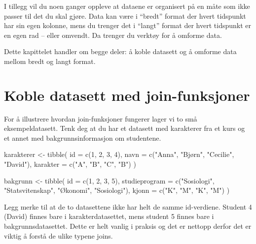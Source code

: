 \documentclass[
  norsk,
  letterpaper,
  DIV=11,
  numbers=noendperiod]{scrreprt}
\newenvironment{Shaded}{\begin{snugshade}}{\end{snugshade}}
\newcommand{\AttributeTok}[1]{\textcolor[rgb]{0.40,0.45,0.13}{#1}}
\newcommand{\DecValTok}[1]{\textcolor[rgb]{0.68,0.00,0.00}{#1}}
\newcommand{\FunctionTok}[1]{\textcolor[rgb]{0.28,0.35,0.67}{#1}}
\newcommand{\NormalTok}[1]{\textcolor[rgb]{0.00,0.23,0.31}{#1}}
\newcommand{\OtherTok}[1]{\textcolor[rgb]{0.00,0.23,0.31}{#1}}
\newcommand{\StringTok}[1]{\textcolor[rgb]{0.13,0.47,0.30}{#1}}
\theoremstyle{definition}
\theoremstyle{remark}
\begin{document}
I tillegg vil du noen ganger oppleve at dataene er organisert på en måte
som ikke passer til det du skal gjøre. Data kan være i ``bredt'' format
der hvert tidspunkt har sin egen kolonne, mens du trenger det i
``langt'' format der hvert tidspunkt er en egen rad -- eller omvendt. Da
trenger du verktøy for å omforme data.

Dette kapittelet handler om begge deler: å koble datasett og å omforme
data mellom bredt og langt format.

\section{Koble datasett med
join-funksjoner}\label{koble-datasett-med-join-funksjoner}

For å illustrere hvordan join-funksjoner fungerer lager vi to små
eksempeldatasett. Tenk deg at du har et datasett med karakterer fra et
kurs og et annet med bakgrunnsinformasjon om studentene.

\begin{Shaded}
\begin{Highlighting}[]
\NormalTok{karakterer }\OtherTok{\textless{}{-}} \FunctionTok{tibble}\NormalTok{(}
  \AttributeTok{id =} \FunctionTok{c}\NormalTok{(}\DecValTok{1}\NormalTok{, }\DecValTok{2}\NormalTok{, }\DecValTok{3}\NormalTok{, }\DecValTok{4}\NormalTok{),}
  \AttributeTok{navn =} \FunctionTok{c}\NormalTok{(}\StringTok{"Anna"}\NormalTok{, }\StringTok{"Bjørn"}\NormalTok{, }\StringTok{"Cecilie"}\NormalTok{, }\StringTok{"David"}\NormalTok{),}
  \AttributeTok{karakter =} \FunctionTok{c}\NormalTok{(}\StringTok{"A"}\NormalTok{, }\StringTok{"B"}\NormalTok{, }\StringTok{"C"}\NormalTok{, }\StringTok{"B"}\NormalTok{)}
\NormalTok{)}

\NormalTok{bakgrunn }\OtherTok{\textless{}{-}} \FunctionTok{tibble}\NormalTok{(}
  \AttributeTok{id =} \FunctionTok{c}\NormalTok{(}\DecValTok{1}\NormalTok{, }\DecValTok{2}\NormalTok{, }\DecValTok{3}\NormalTok{, }\DecValTok{5}\NormalTok{),}
  \AttributeTok{studieprogram =} \FunctionTok{c}\NormalTok{(}\StringTok{"Sosiologi"}\NormalTok{, }\StringTok{"Statsvitenskap"}\NormalTok{, }\StringTok{"Økonomi"}\NormalTok{, }\StringTok{"Sosiologi"}\NormalTok{),}
  \AttributeTok{kjonn =} \FunctionTok{c}\NormalTok{(}\StringTok{"K"}\NormalTok{, }\StringTok{"M"}\NormalTok{, }\StringTok{"K"}\NormalTok{, }\StringTok{"M"}\NormalTok{)}
\NormalTok{)}
\end{Highlighting}
\end{Shaded}

Legg merke til at de to datasettene ikke har helt de samme id-verdiene.
Student 4 (David) finnes bare i karakterdatasettet, mens student 5
finnes bare i bakgrunnsdatasettet. Dette er helt vanlig i praksis og det
er nettopp derfor det er viktig å forstå de ulike typene joins.
\end{document}
